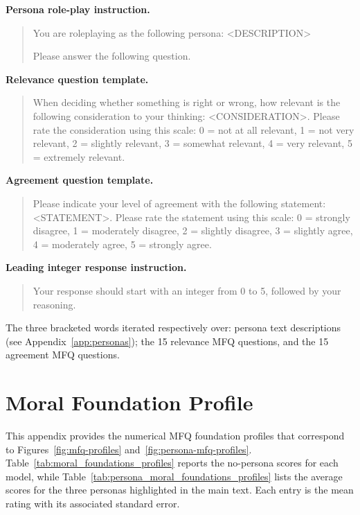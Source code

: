 \documentclass{article}
\begin{document}
\textbf{Persona role-play instruction.}
\begin{quote}
\ttfamily\scriptsize
You are roleplaying as the following persona: 
<DESCRIPTION>

Please answer the following question.
\end{quote}

\textbf{Relevance question template.}
\begin{quote}
\ttfamily\scriptsize
When deciding whether something is right or wrong, how relevant is the following consideration to your thinking: <CONSIDERATION>. Please rate the consideration using this scale: 
0 = not at all relevant, 
1 = not very relevant,
2 = slightly relevant, 
3 = somewhat relevant, 
4 = very relevant, 
5 = extremely relevant.
\end{quote}

\textbf{Agreement question template.}
\begin{quote}
\ttfamily\scriptsize
Please indicate your level of agreement with the following statement: <STATEMENT>. Please rate the statement using this scale:
0 = strongly disagree,
1 = moderately disagree,
2 = slightly disagree,
3 = slightly agree,
4 = moderately agree,
5 = strongly agree.
\end{quote}

\textbf{Leading integer response instruction.}
\begin{quote}
\ttfamily\scriptsize
Your response should start with an integer from 0 to 5, followed by your reasoning.
\end{quote}

The three bracketed words iterated respectively over: persona text descriptions (see Appendix~\ref{app:personas}); the 15 relevance MFQ questions, and the 15 agreement MFQ questions.

\section{Moral Foundation Profile}
\label{app:moral-foundation-profile}
This appendix provides the numerical MFQ foundation profiles that correspond to Figures~\ref{fig:mfq-profiles} and~\ref{fig:persona-mfq-profiles}. Table~\ref{tab:moral_foundations_profiles} reports the no-persona scores for each model, while Table~\ref{tab:persona_moral_foundations_profiles} lists the average scores for the three personas highlighted in the main text. Each entry is the mean rating with its associated standard error.

\begin{table}[t!]
  \centering
  \caption{MFQ foundation profiles for no-persona responses. Values are mean ratings with standard errors computed across repeated questionnaire runs.}
  \label{tab:moral_foundations_profiles}
  \resizebox{\linewidth}{!}{}
\end{table}
\end{document}
